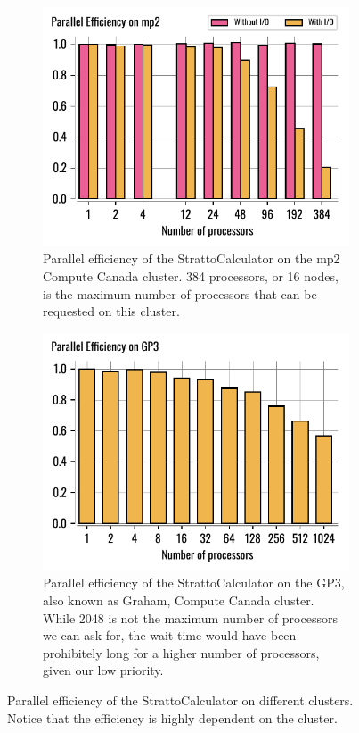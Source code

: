 \documentclass[11pt,SymmetricalJury]{inrsthesis/inrsthesis}
\begin{document}
\begin{figure}
  \centering
  \begin{subfigure}[t]{0.47\textwidth}
    \includegraphics[width=\textwidth]{figs/ParallelEfficiency-mp2.pdf}
    \caption{Parallel efficiency of the StrattoCalculator on the mp2 Compute
             Canada cluster. 384 processors, or 16 nodes, is the maximum number
             of processors that can be requested on this cluster.}
    \label{fig:sc.parallel-efficiency.mp2}
  \end{subfigure}
  \hfill
  \begin{subfigure}[t]{0.47\textwidth}
    \includegraphics[width=\textwidth]{figs/ParallelEfficiency-gp3.pdf}
    \caption{Parallel efficiency of the StrattoCalculator on the GP3, also known
             as Graham, Compute Canada cluster. While 2048 is not the maximum number
             of processors we can ask for, the wait time would have been prohibitely
             long for a higher number of processors, given our low priority.}
    \label{fig:sc.parallel-efficiency.gp3}
  \end{subfigure}
  \caption{Parallel efficiency of the StrattoCalculator on different clusters.
           Notice that the efficiency is highly dependent on the cluster.}
  \label{fig:sc.parallel-efficiency}
\end{figure}
\end{document}
